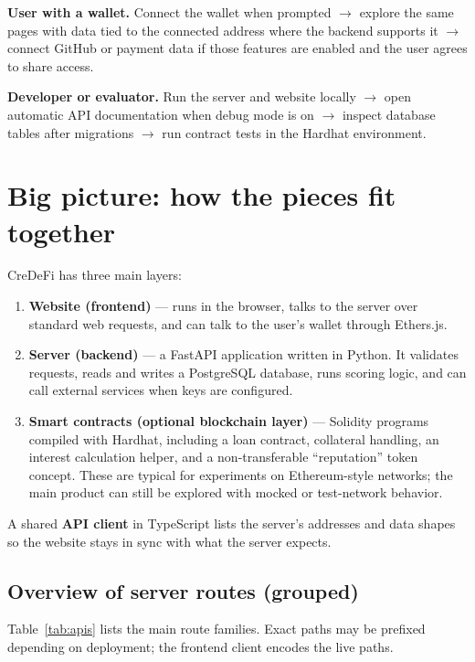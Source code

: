 \documentclass[11pt,a4paper]{article}
\begin{document}
\textbf{User with a wallet.} Connect the wallet when prompted $\rightarrow$ explore the same pages with data tied to the connected address where the backend supports it $\rightarrow$ connect GitHub or payment data if those features are enabled and the user agrees to share access.

\textbf{Developer or evaluator.} Run the server and website locally $\rightarrow$ open automatic API documentation when debug mode is on $\rightarrow$ inspect database tables after migrations $\rightarrow$ run contract tests in the Hardhat environment.

\section{Big picture: how the pieces fit together}
CreDeFi has three main layers:

\begin{enumerate}[leftmargin=*]
  \item \textbf{Website (frontend)} --- runs in the browser, talks to the server over standard web requests, and can talk to the user's wallet through Ethers.js.
  \item \textbf{Server (backend)} --- a FastAPI application written in Python. It validates requests, reads and writes a PostgreSQL database, runs scoring logic, and can call external services when keys are configured.
  \item \textbf{Smart contracts (optional blockchain layer)} --- Solidity programs compiled with Hardhat, including a loan contract, collateral handling, an interest calculation helper, and a non-transferable ``reputation'' token concept. These are typical for experiments on Ethereum-style networks; the main product can still be explored with mocked or test-network behavior.
\end{enumerate}

A shared \textbf{API client} in TypeScript lists the server's addresses and data shapes so the website stays in sync with what the server expects.

\subsection{Overview of server routes (grouped)}
Table~\ref{tab:apis} lists the main route families. Exact paths may be prefixed depending on deployment; the frontend client encodes the live paths.
\end{document}
